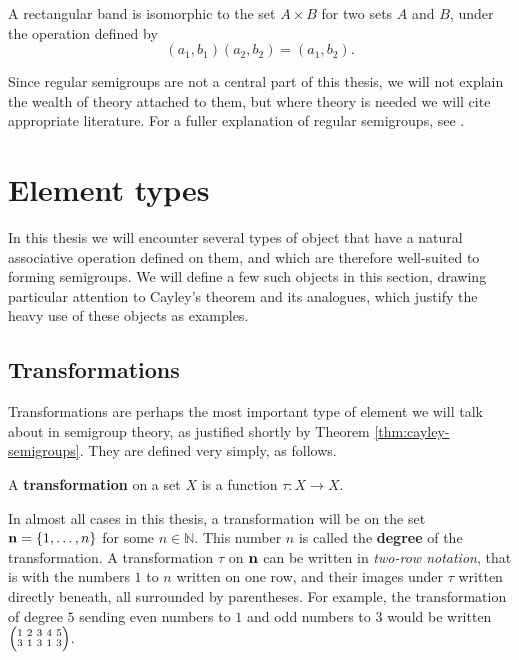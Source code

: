\begin{theorem}
  \label{thm:rectangular-band}
  A rectangular band is isomorphic to the set $A \times B$ for two sets $A$ and
  $B$, under the operation defined by
  $$(a_1, b_1) (a_2, b_2) = (a_1, b_2).$$
\end{theorem}

Since regular semigroups are not a central part of this thesis,
we will not explain the wealth of theory attached to them, but where theory is
needed we will cite appropriate literature.  For a fuller explanation of regular
semigroups, see \cite[\S2.4]{howie}.

\section{Element types}
\label{sec:element-types}

In this thesis we will encounter several types of object that have a natural
associative operation defined on them, and which are therefore well-suited to
forming semigroups.  We will define a few such objects in this section, drawing
particular attention to Cayley's theorem and its analogues, which justify the
heavy use of these objects as examples.

\subsection{Transformations}
\label{sec:transformations}

Transformations are perhaps the most important type of element we will talk
about in semigroup theory, as justified shortly by Theorem
\ref{thm:cayley-semigroups}.  They are defined very simply, as follows.

\begin{definition}
  \label{def:transformation}
  A \textbf{transformation} on a set $X$ is a function $\tau: X \to X$.
\end{definition}

In almost all cases in this thesis, a transformation will be on the set
$\mathbf{n} = \{1, \ldots, n\}$ for some $n \in \mathbb{N}$.  This number $n$ is called
the \textbf{degree} of the transformation. A transformation
$\tau$ on $\mathbf{n}$ can be written in \textit{two-row notation},  that is with the numbers $1$ to $n$ written on one row, and their
images under $\tau$ written directly beneath, all surrounded by parentheses.
For example, the transformation of degree $5$ sending even numbers to $1$ and
odd numbers to $3$ would be written $\transV31313$.

